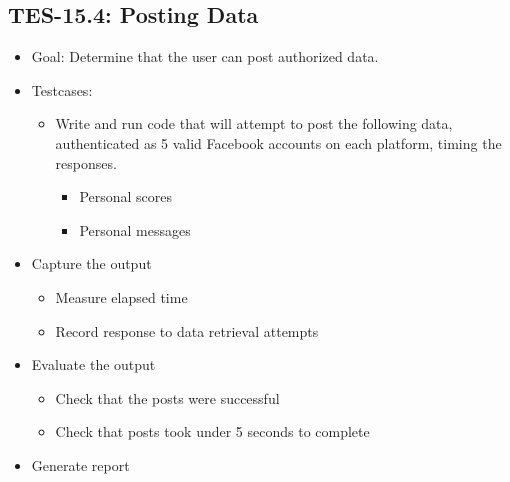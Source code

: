 \subsection{TES-15.4: Posting Data}
\begin{itemize}
\item Goal: Determine that the user can post authorized data.
\item Testcases: 
\begin{itemize}
\item Write and run code that will attempt to post the following data, 
authenticated as 5 valid Facebook accounts on each platform, 
timing the responses.
\begin{itemize}
\item Personal scores
\item Personal messages
\end{itemize}
\end{itemize}
\item Capture the output 
\begin{itemize}
\item Measure elapsed time 
\item Record response to data retrieval attempts
\end{itemize}
\item Evaluate the output 
\begin{itemize}
\item Check that the posts were successful
\item Check that posts took under 5 seconds to complete
\end{itemize}
\item Generate report 
\end{itemize}


